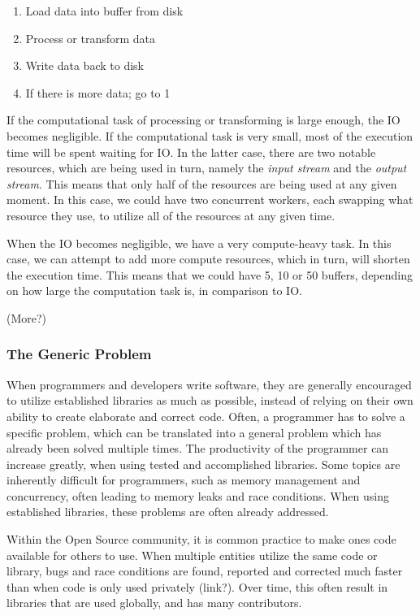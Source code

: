 \documentclass[a4paper]{article}
\begin{document}
\begin{enumerate}
\item Load data into buffer from disk
\item Process or transform data
\item Write data back to disk
\item If there is more data; go to 1
\end{enumerate}

If the computational task of processing or transforming is large enough, the IO becomes negligible. If the
computational task is very small, most of the execution time will be spent waiting for IO. In the latter case,
there are two notable resources, which are being used in turn, namely the \textit{input stream} and the
\textit{output stream}. This means that only half of the resources are being used at any given moment. In this
case, we could have two concurrent workers, each swapping what resource they use, to utilize all of the resources
at any given time.

When the IO becomes negligible, we have a very compute-heavy task. In this case, we can attempt to add more
compute resources, which in turn, will shorten the execution time. This means that we could have 5, 10 or 50
buffers, depending on how large the computation task is, in comparison to IO.

(More?)


\subsubsection{The Generic Problem}
When programmers and developers write software, they are generally encouraged to utilize established
libraries as much as possible, instead of relying on their own ability to create elaborate and correct
code. Often, a programmer has to solve a specific problem, which can be translated into a general problem
which has already been solved multiple times. The productivity of the programmer can increase greatly,
when using tested and accomplished libraries. Some topics are inherently difficult for programmers, such
as memory management and concurrency, often leading to memory leaks and race conditions. When using
established libraries, these problems are often already addressed.

Within the Open Source community, it is common practice to make ones code available for others to use.
When multiple entities utilize the same code or library, bugs and race conditions are found, reported and corrected
much faster than when code is only used privately (link?). Over time, this often result in libraries that are
used globally, and has many contributors.
\end{document}
